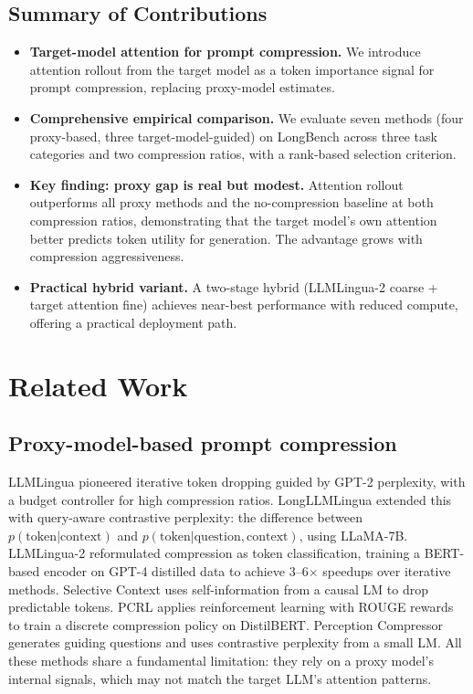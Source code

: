 \documentclass[11pt,letterpaper]{article}
\begin{document}
\subsection{Summary of Contributions}
\begin{itemize}
  \item \textbf{Target-model attention for prompt compression.} We introduce attention rollout from the target model as a token importance signal for prompt compression, replacing proxy-model estimates.
  \item \textbf{Comprehensive empirical comparison.} We evaluate seven methods (four proxy-based, three target-model-guided) on LongBench across three task categories and two compression ratios, with a rank-based selection criterion.
  \item \textbf{Key finding: proxy gap is real but modest.} Attention rollout outperforms all proxy methods and the no-compression baseline at both compression ratios, demonstrating that the target model's own attention better predicts token utility for generation. The advantage grows with compression aggressiveness.
  \item \textbf{Practical hybrid variant.} A two-stage hybrid (LLMLingua-2 coarse + target attention fine) achieves near-best performance with reduced compute, offering a practical deployment path.
\end{itemize}

\section{Related Work}

\subsection{Proxy-model-based prompt compression}
LLMLingua \citep{Jiang2023} pioneered iterative token dropping guided by GPT-2 perplexity, with a budget controller for high compression ratios. LongLLMLingua \citep{Jiang2024} extended this with query-aware contrastive perplexity: the difference between $p(\text{token}|\text{context})$ and $p(\text{token}|\text{question}, \text{context})$, using LLaMA-7B. LLMLingua-2 \citep{Pan2024} reformulated compression as token classification, training a BERT-based encoder on GPT-4 distilled data to achieve 3--6$\times$ speedups over iterative methods. Selective Context \citep{Li2023} uses self-information from a causal LM to drop predictable tokens. PCRL \citep{Jung2023} applies reinforcement learning with ROUGE rewards to train a discrete compression policy on DistilBERT. Perception Compressor \citep{Tang2025} generates guiding questions and uses contrastive perplexity from a small LM. All these methods share a fundamental limitation: they rely on a proxy model's internal signals, which may not match the target LLM's attention patterns.
\end{document}
